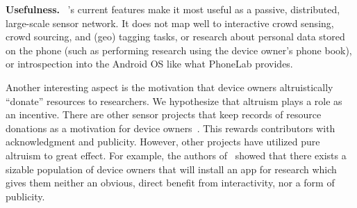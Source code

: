 

\textbf{Usefulness.}~
\sysname's current features make it most 
useful as a passive, distributed, large-scale sensor network. 
It does not map well to interactive crowd sensing, crowd sourcing, 
and (geo) tagging tasks, or research about personal data stored 
on the phone (such as performing research using the device owner's 
phone book),
or introspection into the Android OS like what PhoneLab provides. 


Another interesting aspect is the motivation that 
device owners altruistically ``donate'' resources to researchers. 
We hypothesize that altruism plays a role as an incentive. 
There are other sensor projects that keep records of 
resource donations as a motivation for device owners~\cite{OpenWLANMap}.
This rewards contributors with acknowledgment and publicity. 
However, other projects have utilized pure altruism to 
great effect. For example, the authors of~\cite{wang2011untold} 
showed that there exists a sizable population of device 
owners that will install an app for research which gives them neither an obvious, 
direct benefit from interactivity, nor a form of publicity.


